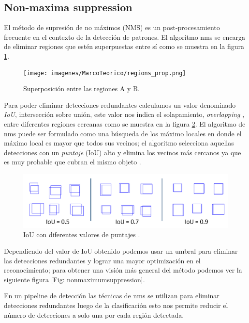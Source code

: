 \subsection{Non-maxima suppression}\label{sub:nonmaximumsuppression}

El método de supresión de no máximos (NMS) es un post-procesamiento frecuente en el contexto de la detección de patrones. El algoritmo  \ac{nms} se encarga de eliminar regiones que estén superpuestas entre sí como se muestra en la figura  \ref{Fig: overlapping}.

\begin{figure}[H]
 \centering
  \texttt{[image: imagenes/MarcoTeorico/regions\_prop.png]}
  \caption{Superposición entre las regiones A y B.} \label{Fig: overlapping}
\end{figure}

Para poder eliminar detecciones redundantes calculamos un valor denominado  \textit{IoU}, intersección sobre unión,  este valor nos indica el solapamiento, \textit{overlapping} ,  entre diferentes regiones cercanas como se muestra en la figura \ref{Fig: interseccion}. El algoritmo de \ac{nms} puede ser formulado como una búsqueda de los máximo locales en donde el máximo local es  mayor que todos sus vecinos; el algoritmo selecciona aquellas detecciones con un \textit{puntaje} (IoU) alto y elimina los vecinos más cercanos ya que es muy probable que cubran el mismo objeto \citep{nms2}.

\begin{figure}[H]
 \centering
  \includegraphics[scale=0.3,keepaspectratio=true,clip=true]{imagenes/MarcoTeorico/overlapping.png}
  \caption{IoU con diferentes valores de puntajes \citep{bishop}.}\label{Fig: interseccion}
\end{figure}

Dependiendo del valor de IoU  obtenido podemos usar un umbral para  eliminar las detecciones redundantes y lograr una mayor optimización  en el reconocimiento; para obtener una visión más general del método podemos ver la siguiente figura \ref{Fig: nonmaximumsuppression}. 

En un pipeline de detección las técnicas de \ac{nms}  se utilizan para eliminar detecciones redundantes luego de la clasificación esto nos permite reducir el número de detecciones a solo una por cada región detectada.

